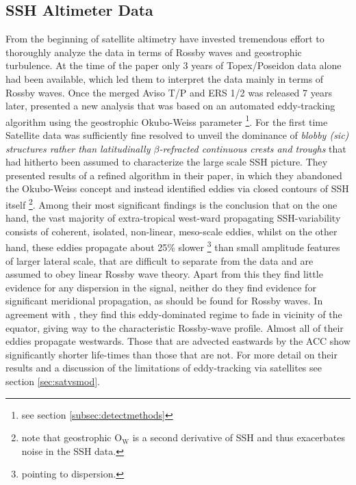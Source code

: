\subsection{SSH Altimeter Data \cite{Chelton2007,Chelton2011}}\label{sec:hist_chelton}
From the beginning of satellite altimetry \citeauthor{Chelton2011} have invested tremendous effort to thoroughly analyze the data in terms of
Rossby waves and geostrophic turbulence. At the time of the \citet{Killworth1997a} paper only 3 years of Topex/Poseidon data alone had been available,
which led them to interpret the data mainly in terms of Rossby waves. Once the merged Aviso T/P and ERS 1/2  was released 7 years later,
\citeauthor{Chelton2007} presented a new analysis that was based on an automated eddy-tracking algorithm using the geostrophic Okubo-Weiss parameter
\footnote{see section \ref{subsec:detectmethods}}. For the first time Satellite data was sufficiently fine resolved to unveil the dominance of \textit{blobby
(sic) structures rather than latitudinally $\beta$-refracted continuous crests and troughs} that had hitherto been assumed to characterize the large scale SSH
picture. They presented results of a refined algorithm in their \citeyear{Chelton2011} paper, in
which they abandoned the Okubo-Weiss concept and instead identified eddies via closed contours of SSH itself \footnote{note that geostrophic $\mathrm{O_W}$ is a
second derivative of SSH and thus exacerbates noise in the SSH data.}. Among their most significant findings is the conclusion that on the one hand, the vast
majority of extra-tropical west-ward propagating SSH-variability consists of coherent, isolated, non-linear, meso-scale eddies, whilst on the other hand, these
eddies propagate about 25\% slower \footnote{pointing to dispersion.} than small amplitude features of larger lateral scale, that are difficult to separate from
the data and are assumed to obey linear Rossby wave theory.  Apart from this they find little evidence for any dispersion in the signal,
neither do they find evidence for significant meridional propagation, as should be found for Rossby waves. In agreement with \citet{rhines1979theoretical}, they
find this eddy-dominated regime to fade in vicinity of the equator,
giving way to the characteristic Rossby-wave profile. Almost all of their eddies propagate westwards. Those that are advected eastwards by \eg the ACC show significantly shorter life-times than those that are not. For more detail on their results and a discussion of the limitations of eddy-tracking via satellites see section \ref{sec:satvsmod}.
